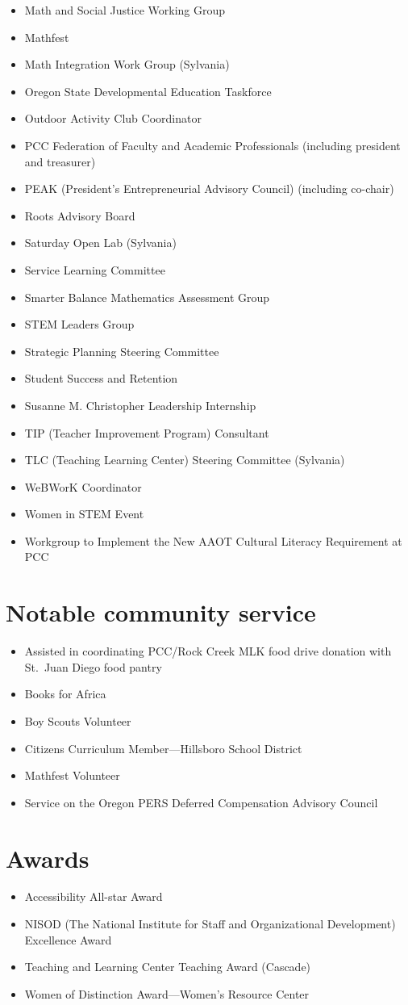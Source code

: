 \begin{itemize}[label={}]
\item Math and Social Justice Working Group
\item Mathfest
\item Math Integration Work Group (Sylvania)
\item Oregon State Developmental Education Taskforce
\item Outdoor Activity Club Coordinator
\item PCC Federation of Faculty and Academic Professionals (including president and treasurer)
\item PEAK (President's Entrepreneurial Advisory Council) (including co-chair)
\item Roots Advisory Board
\item Saturday Open Lab (Sylvania)
\item Service Learning Committee
\item Smarter Balance Mathematics Assessment Group
\item STEM Leaders Group
\item Strategic Planning Steering Committee
\item Student Success and Retention
\item Susanne M. Christopher Leadership Internship
\item TIP (Teacher Improvement Program) Consultant
\item TLC (Teaching Learning Center) Steering Committee (Sylvania)
\item WeBWorK Coordinator
\item Women in STEM Event
\item Workgroup to Implement the New AAOT Cultural Literacy Requirement at PCC
\end{itemize}

\section*{Notable community service}

\begin{itemize}
\item Assisted in coordinating PCC/Rock Creek MLK food drive donation with St.\ Juan Diego food pantry
\item Books for Africa
\item Boy Scouts Volunteer
\item Citizens Curriculum Member---Hillsboro School District
\item Mathfest Volunteer
\item Service on the Oregon PERS Deferred Compensation Advisory Council
\end{itemize}

\section*{Awards}

\begin{itemize}
\item Accessibility All-star Award
\item NISOD (The National Institute for Staff and Organizational Development) Excellence Award
\item Teaching and Learning Center Teaching Award (Cascade)
\item Women of Distinction Award---Women's Resource Center
\end{itemize}
